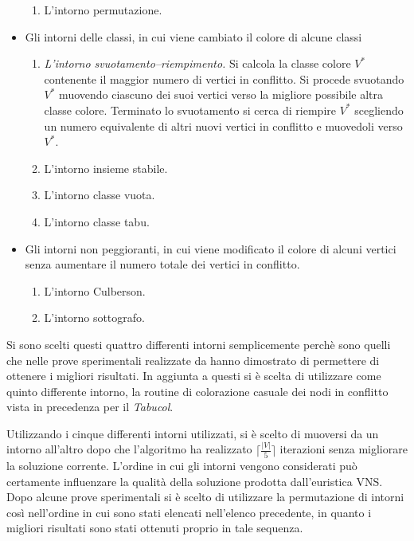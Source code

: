 \documentclass[a4paper,10pt]{article}
\newcommand{\tabucol}{\emph{Tabucol}}
\begin{document}
\begin{itemize}
\begin{enumerate}
        \item L'intorno permutazione.
    \end{enumerate}
 \item Gli intorni delle classi, in cui viene cambiato il colore di alcune classi 
    \begin{enumerate}
        \item \emph{L'intorno svuotamento--riempimento.} Si calcola la classe colore $V^{*}$ contenente il maggior numero di vertici in conflitto. Si procede svuotando $V^{*}$  muovendo ciascuno dei suoi vertici verso la migliore possibile altra classe colore. Terminato lo svuotamento si cerca di riempire $V^{*}$ scegliendo un numero equivalente di altri nuovi vertici in conflitto e muovedoli verso $V^{*}$.
        \item L'intorno insieme stabile.
        \item L'intorno classe vuota.
        \item L'intorno classe tabu.
    \end{enumerate}
 \item Gli intorni non peggioranti, in cui viene modificato il colore di alcuni vertici senza aumentare il numero totale dei vertici in conflitto.
    \begin{enumerate}
        \item L'intorno Culberson.
        \item L'intorno sottografo.
    \end{enumerate}
\end{itemize}
Si sono scelti questi quattro differenti intorni semplicemente perchè sono quelli che nelle prove sperimentali realizzate da \cite{vns_hertz} hanno dimostrato di permettere di ottenere i migliori risultati. In aggiunta a questi si è scelta di utilizzare come quinto differente intorno, la routine di colorazione casuale dei nodi in conflitto vista in precedenza per il \tabucol{}. 

Utilizzando i cinque differenti intorni utilizzati, si è scelto di muoversi da un intorno all'altro dopo che l'algoritmo ha realizzato $\lceil\frac{|V|}{5}\rceil$ iterazioni senza migliorare la soluzione corrente. L'ordine in cui gli intorni vengono considerati può certamente influenzare la qualità della soluzione prodotta dall'euristica VNS. Dopo alcune prove sperimentali si è scelto di utilizzare la permutazione di intorni così nell'ordine in cui sono stati elencati nell'elenco precedente, in quanto i migliori risultati sono stati ottenuti proprio in tale sequenza.
\end{document}
